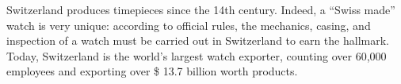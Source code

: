 Switzerland produces timepieces since the 14th century.
Indeed, a ``Swiss made'' watch is very unique: according to official rules, the mechanics, casing, and inspection of a watch must be carried out in Switzerland to earn the hallmark.
Today, Switzerland is the world's largest watch exporter, counting over 60,000 employees and exporting over \$ 13.7 billion worth products.
